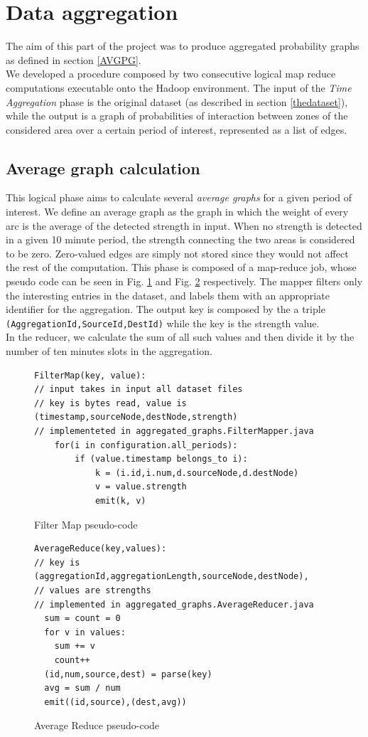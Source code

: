 \section{Data aggregation}
\label{aggregation}
The aim of this part of the project was to produce aggregated probability graphs as defined in section \ref{AVGPG}.
\\ 
We developed a procedure composed by two consecutive logical map reduce computations executable onto the Hadoop environment.
The input of the \emph{Time Aggregation} phase is the original dataset (as described in section \ref{thedataset}), while the output is a graph of probabilities of interaction between zones of the considered area
over a certain period of interest, represented as a list of edges.
\subsection{Average graph calculation}
This logical phase aims to calculate several \emph{average graphs} for a given period of interest.
We define an average graph as the graph in which the weight of every arc is the average of the detected strength in input. When no strength is detected in a given 10 minute period, the strength connecting the two areas is considered to be zero. Zero-valued
edges are simply not stored since they would not affect the rest of the computation.
This phase is composed of a map-reduce job, whose pseudo code can be seen in Fig. \ref{fig:filtermap} and Fig. \ref{fig:averagereduce} respectively.
The mapper filters only the interesting entries in the dataset, and labels them with an appropriate identifier for the aggregation. The output key is composed by the  a triple \texttt{(AggregationId,SourceId,DestId)} while the key is the strength value.\\
In the reducer, we calculate the sum of all such values and then divide it by the number of ten minutes slots in the aggregation.

\begin{figure}
\begin{verbatim}
FilterMap(key, value):
// input takes in input all dataset files
// key is bytes read, value is (timestamp,sourceNode,destNode,strength)
// implementeted in aggregated_graphs.FilterMapper.java
    for(i in configuration.all_periods):
        if (value.timestamp belongs_to i):
  	        k = (i.id,i.num,d.sourceNode,d.destNode)
  	        v = value.strength
            emit(k, v)
\end{verbatim}
\caption{Filter Map pseudo-code}
\label{fig:filtermap}
\end{figure}
\begin{figure}
\begin{verbatim}
AverageReduce(key,values):
// key is (aggregationId,aggregationLength,sourceNode,destNode), 
// values are strengths
// implemented in aggregated_graphs.AverageReducer.java
  sum = count = 0
  for v in values:
  	sum += v
  	count++
  (id,num,source,dest) = parse(key)
  avg = sum / num
  emit((id,source),(dest,avg))
\end{verbatim}
\caption{Average Reduce pseudo-code}
\label{fig:averagereduce}
\end{figure} 

